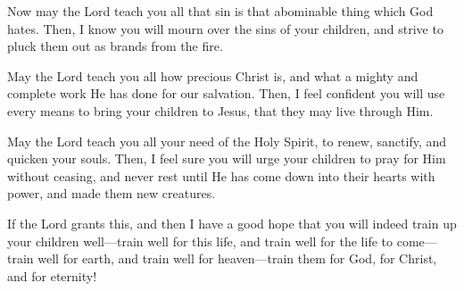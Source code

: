 \documentclass[
]{book}
\begin{document}
Now may the Lord teach you all that sin is that abominable thing which God hates. Then, I know you will mourn over the sins of your children, and strive to pluck them out as brands from the fire.

May the Lord teach you all how precious Christ is, and what a mighty and complete work He has done for our salvation. Then, I feel confident you will use every means to bring your children to Jesus, that they may live through Him.

May the Lord teach you all your need of the Holy Spirit, to renew, sanctify, and quicken your souls. Then, I feel sure you will urge your children to pray for Him without ceasing, and never rest until He has come down into their hearts with power, and made them new creatures.

If the Lord grants this, and then I have a good hope that you will indeed train up your children well---train well for this life, and train well for the life to come---train well for earth, and train well for heaven---train them for God, for Christ, and for eternity!
\end{document}
